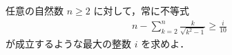 任意の自然数 $n \ge 2$ に対して，常に不等式
\begin{align}
  n - \sum_{k=2}^{n} \frac{k}{\sqrt{k^2 - 1}} \ge \frac{i}{10}
\end{align}
が成立するような最大の整数 $i$ を求めよ．

